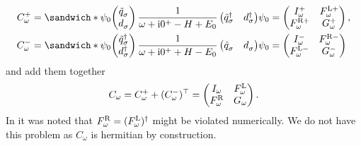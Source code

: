 \begin{subequations}
    \begin{align}
        C^+_\omega
         & =
        \sandwich*
        {\psi_0}
        {
            \begin{pmatrix}
                \tilde q^{\pdag}_\sigma \\
                d^{\pdag}_\sigma
            \end{pmatrix}
            \frac{1}{\omega + \mi0^+ - H + E_0}
            \begin{pmatrix}
                \tilde q^\dag_\sigma & d^\dag_\sigma
            \end{pmatrix}
        }
        {\psi_0}
        =
        \begin{pmatrix}
            I^+_\omega      & F^{\mL+}_\omega \\
            F^{\mR+}_\omega & G^+_\omega
        \end{pmatrix}, \\
        C^-_\omega
         & =
        \sandwich*
        {\psi_0}
        {
            \begin{pmatrix}
                \tilde q^\dag_\sigma \\
                d^\dag_\sigma
            \end{pmatrix}
            \frac{1}{\omega + \mi0^+ + H - E_0}
            \begin{pmatrix}
                \tilde q^{\pdag}_\sigma & d^{\pdag}_\sigma
            \end{pmatrix}
        }
        {\psi_0}
        =
        \begin{pmatrix}
            I^-_\omega      & F^{\mR-}_\omega \\
            F^{\mL-}_\omega & G^-_\omega
        \end{pmatrix}
    \end{align}
\end{subequations}
and add them together
\begin{equation}
    C_\omega
    =
    C^+_\omega + (C^-_\omega)^\top
    =
    \begin{pmatrix}
        I_\omega       & F^{\mathrm{L}}_\omega \\
        F^{\mathrm{R}}_\omega & G_\omega
    \end{pmatrix}.
\end{equation}
In \cite{Kugler2022} it was noted that $F^{\mathrm{R}}_\omega = (F^{\mathrm{L}}_\omega)^\dag$
might be violated numerically.
We do not have this problem as $C_\omega$ is hermitian by construction.

